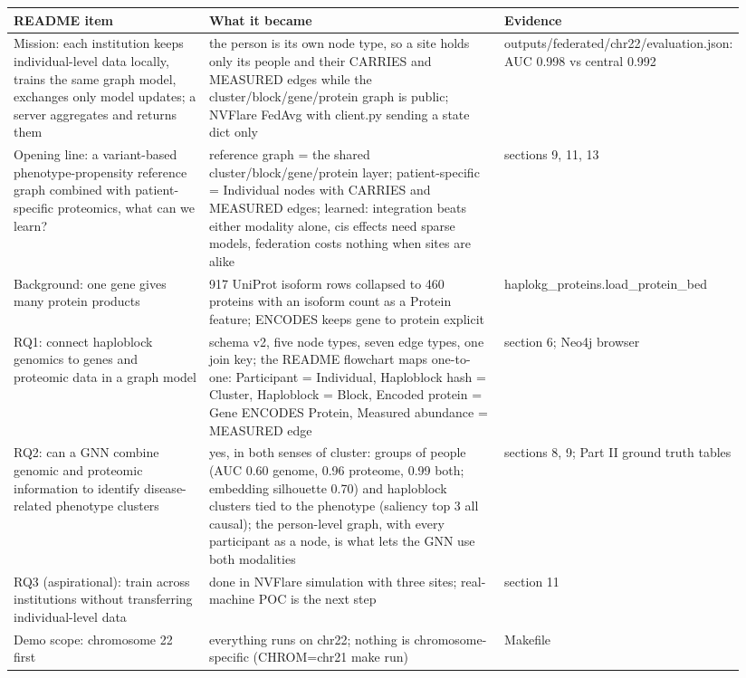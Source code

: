 \documentclass[11pt,a4paper]{article}
\begin{document}
\begin{longtable}{p{0.282\linewidth}p{0.423\linewidth}p{0.235\linewidth}}
\toprule
\textbf{README item} & \textbf{What it became} & \textbf{Evidence} \\
\midrule
\endhead
Mission: each institution keeps individual-level data locally, trains the same graph model, exchanges only model updates; a server aggregates and returns them & the person is its own node type, so a site holds only its people and their CARRIES and MEASURED edges while the cluster/block/gene/protein graph is public; NVFlare FedAvg with client.py sending a state dict only & outputs/federated/chr22/evaluation.json: AUC 0.998 vs central 0.992 \\
Opening line: a variant-based phenotype-propensity reference graph combined with patient-specific proteomics, what can we learn? & reference graph = the shared cluster/block/gene/protein layer; patient-specific = Individual nodes with CARRIES and MEASURED edges; learned: integration beats either modality alone, cis effects need sparse models, federation costs nothing when sites are alike & sections 9, 11, 13 \\
Background: one gene gives many protein products & 917 UniProt isoform rows collapsed to 460 proteins with an isoform count as a Protein feature; ENCODES keeps gene to protein explicit & haplokg\_proteins.load\_protein\_bed \\
RQ1: connect haploblock genomics to genes and proteomic data in a graph model & schema v2, five node types, seven edge types, one join key; the README flowchart maps one-to-one: Participant = Individual, Haploblock hash = Cluster, Haploblock = Block, Encoded protein = Gene ENCODES Protein, Measured abundance = MEASURED edge & section 6; Neo4j browser \\
RQ2: can a GNN combine genomic and proteomic information to identify disease-related phenotype clusters & yes, in both senses of cluster: groups of people (AUC 0.60 genome, 0.96 proteome, 0.99 both; embedding silhouette 0.70) and haploblock clusters tied to the phenotype (saliency top 3 all causal); the person-level graph, with every participant as a node, is what lets the GNN use both modalities & sections 8, 9; Part II ground truth tables \\
RQ3 (aspirational): train across institutions without transferring individual-level data & done in NVFlare simulation with three sites; real-machine POC is the next step & section 11 \\
Demo scope: chromosome 22 first & everything runs on chr22; nothing is chromosome-specific (CHROM=chr21 make run) & Makefile \\

\end{longtable}
\end{document}
